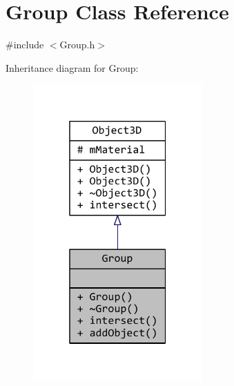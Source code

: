 \hypertarget{classGroup}{\section{Group Class Reference}
\label{classGroup}
}


{\ttfamily \#include $<$Group.\+h$>$}



Inheritance diagram for Group\+:
\nopagebreak
\begin{figure}[H]
\begin{center}
\leavevmode
\includegraphics[width=184pt]{classGroup__inherit__graph}
\end{center}
\end{figure}


